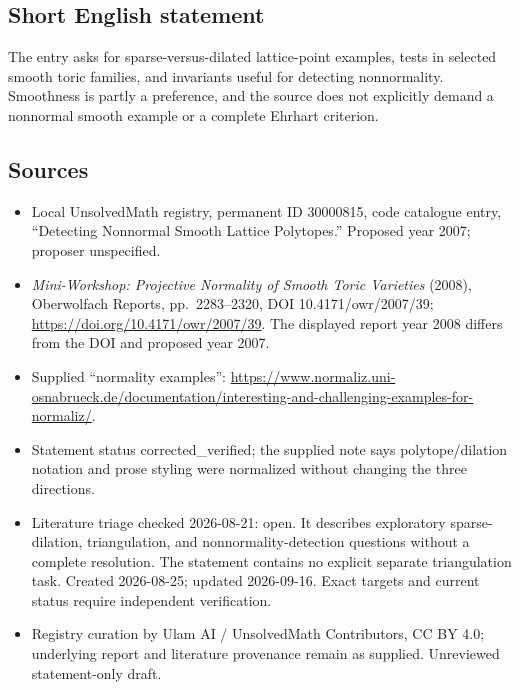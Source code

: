 \documentclass[11pt]{article}
\begin{document}
\subsection{Short English statement}
The entry asks for sparse-versus-dilated lattice-point examples, tests in selected smooth toric families, and invariants useful for detecting nonnormality. Smoothness is partly a preference, and the source does not explicitly demand a nonnormal smooth example or a complete Ehrhart criterion.
\subsection{Sources}
\begin{itemize}
\item Local UnsolvedMath registry, permanent ID 30000815, code catalogue entry, ``Detecting Nonnormal Smooth Lattice Polytopes.'' Proposed year 2007; proposer unspecified.
\item \emph{Mini-Workshop: Projective Normality of Smooth Toric Varieties} (2008), Oberwolfach Reports, pp.\ 2283--2320, DOI 10.4171/owr/2007/39; \url{https://doi.org/10.4171/owr/2007/39}. The displayed report year 2008 differs from the DOI and proposed year 2007.
\item Supplied ``normality examples'': \url{https://www.normaliz.uni-osnabrueck.de/documentation/interesting-and-challenging-examples-for-normaliz/}.
\item Statement status corrected\_verified; the supplied note says polytope/dilation notation and prose styling were normalized without changing the three directions.
\item Literature triage checked 2026-08-21: open. It describes exploratory sparse-dilation, triangulation, and nonnormality-detection questions without a complete resolution. The statement contains no explicit separate triangulation task. Created 2026-08-25; updated 2026-09-16. Exact targets and current status require independent verification.
\item Registry curation by Ulam AI / UnsolvedMath Contributors, CC BY 4.0; underlying report and literature provenance remain as supplied. Unreviewed statement-only draft.
\end{itemize}
\end{document}
